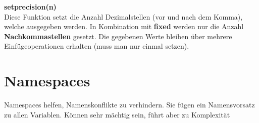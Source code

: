 \textbf{setprecision(n)}\\

Diese Funktion setzt die Anzahl Dezimalstellen (vor und nach dem Komma), welche ausgegeben werden. 
In Kombination mit \textbf{fixed} werden nur die Anzahl \textbf{Nachkommastellen} gesetzt. 
Die gegebenen Werte bleiben über mehrere Einfügeoperationen erhalten (muss man nur einmal setzen). 

\section{Namespaces}

Namespaces helfen, Namenskonflikte zu verhindern. 
Sie fügen ein Namensvorsatz zu allen Variablen. 
Können sehr mächtig sein, führt aber zu Komplexität

